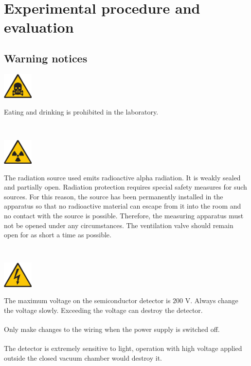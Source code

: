 \clearpage
\section{Experimental procedure and evaluation}
%
\subsection{Warning notices}\label{sec:warningnotices}
%
\begin{minipage}[c]{.15\linewidth}
	\includegraphics[width=1.5cm]{img/toxic}
\end{minipage}
\begin{minipage}[t]{.85\linewidth}
	Eating and drinking is prohibited in the laboratory.
\end{minipage}\vspace{1em}\\ 
\begin{minipage}[c]{.15\linewidth}
	\includegraphics[width=1.5cm]{img/radioactive}
\end{minipage}
\begin{minipage}[t]{.85\linewidth}
	The radiation source used emits radioactive alpha radiation. It is weakly sealed and partially open. Radiation protection requires special safety measures for such sources. For this reason, the source has been permanently installed in the apparatus so that no radioactive material can escape from it into the room and no contact with the source is possible. Therefore, the measuring apparatus must not be opened under any circumstances. The ventilation valve should remain open for as short a time as possible.
\end{minipage}\vspace{1em}\\ 
\begin{minipage}[c]{.15\linewidth}
	\includegraphics[width=1.5cm]{img/electric}
\end{minipage}
\begin{minipage}[t]{.85\linewidth}
	The maximum voltage on the semiconductor detector is $200$ V. Always change the voltage slowly. Exceeding the voltage can destroy the detector.
	\\ \\
	Only make changes to the wiring when the power supply is switched off.
	\\ \\
	The detector is extremely sensitive to light, operation with high voltage applied outside the closed vacuum chamber would destroy it.
\end{minipage}\vspace{1em}\\ 
